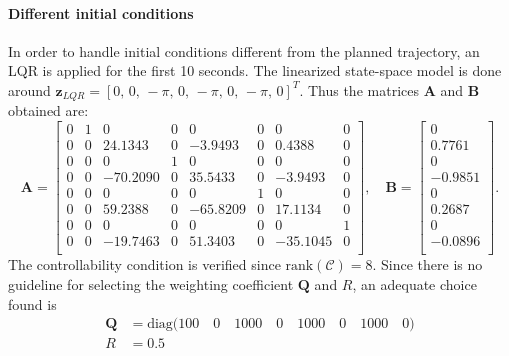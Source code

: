 \documentclass[a4paper,12pt]{article}
\begin{document}
\paragraph{Different initial conditions}
In order to handle initial conditions different from the planned trajectory, an LQR is applied for the first 10 seconds. The linearized state-space model is done around $\mathbf{z}_{LQR}=[0,\,0,\,-\pi,\, 0,\, -\pi,\,0,\,-\pi,\,0]^T$. Thus the matrices $\mathbf{A}$ and $\mathbf{B}$ obtained are:
\begin{equation}
\mathbf{A} =
\begin{bmatrix}
 0 & 1 &        0 & 0 &        0 &      0 &        0 &      0 \\
 0 & 0 &  24.1343 & 0 &  -3.9493 &      0 &   0.4388 &      0 \\
 0 & 0 &        0 & 1 &        0 &      0 &        0 &      0 \\
 0 & 0 & -70.2090 &      0 &  35.5433 &      0 &  -3.9493 &      0 \\
 0 & 0 &        0 &      0 &        0 & 1 &        0 &      0 \\
 0 & 0 &  59.2388 &      0 & -65.8209 &      0 &  17.1134 &      0 \\
 0 & 0 &        0 &      0 &        0 &      0 &        0 & 1 \\
 0 & 0 & -19.7463 &      0 &  51.3403 &      0 & -35.1045 &      0 \\
\end{bmatrix},\quad
\mathbf{B} =
\begin{bmatrix}
     0\\
0.7761\\
     0\\
-0.9851\\
     0\\
0.2687\\
     0\\
-0.0896\\
\end{bmatrix}.
\end{equation}
The controllability condition is verified since $\text{rank}(\mathcal{C})=8$.
Since there is no guideline for selecting the weighting coefficient $\mathbf{Q}$ and $R$, an adequate choice found is
\begin{equation}
\begin{split}
\mathbf{Q}&=\text{diag}\big(100\quad0\quad1000\quad0\quad1000\quad0\quad1000\quad0\big)\\
R&=0.5
\end{split}
\end{equation}
\end{document}
